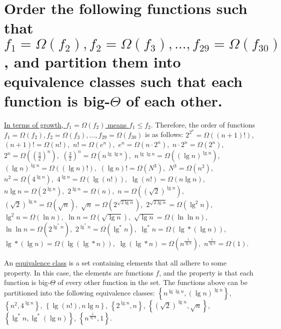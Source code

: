 \section[Problem 6]{Order the following functions such that $f_1 = \Omega(f_2), f_2 = \Omega(f_3), ..., f_{29} = \Omega(f_{30})$, and partition them into equivalence classes such that each function is big-$\Theta$ of each other.}

\ul{In terms of growth, $f_1 = \Omega(f_2)$ means $f_1 \leq f_2$}. Therefore, the order of functions $f_1 = \Omega(f_2), f_2 = \Omega(f_3), ..., f_{29} = \Omega(f_{30})$ is as follows:
$2^{2^n} = \Omega \left((n + 1)! \right), $
$(n + 1)! = \Omega \left(n! \right), $
$n! = \Omega \left(e^n \right), $
$e^n = \Omega \left(n \cdot 2^n \right), $
$n \cdot 2^n = \Omega \left(2^n \right), $
$2^n = \Omega \left(\left( \frac{3}{2} \right)^n \right), $
$\left( \frac{3}{2} \right)^n = \Omega \left(n^{\lg \lg n} \right), $
$n^{\lg \lg n} = \Omega \left(\left( \lg n \right)^{\lg n} \right), $
$\left( \lg n \right)^{\lg n} = \Omega \left((\lg n)! \right), $
$(\lg n)! = \Omega \left(N^3 \right), $
$N^3 = \Omega \left(n^2 \right), $
$n^2 = \Omega \left(4^{\lg n} \right), $
$4^{\lg n} = \Omega \left(\lg (n!) \right), $
$\lg (n!)  = \Omega \left(n \lg n \right), $
$n \lg n = \Omega \left(2^{\lg n} \right), $
$2^{\lg n} = \Omega \left(n \right), $
$n = \Omega \left(\left( \sqrt{2} \right)^{\lg n} \right), $
$\left( \sqrt{2} \right)^{\lg n} = \Omega \left(\sqrt{n} \right), $
$\sqrt{n} = \Omega \left(2^{\sqrt{2 \lg n}} \right), $
$2^{\sqrt{2 \lg n}} = \Omega \left(\lg ^2 n \right), $
$\lg ^2 n = \Omega \left(\ln n \right), $
$\ln n = \Omega \left(\sqrt{\lg n} \right), $
$\sqrt{\lg n} = \Omega \left(\ln \ln n \right), $
$\ln \ln n = \Omega \left(2^{\lg ^* n} \right), $
$2^{\lg ^* n} = \Omega \left(\lg ^* n \right), $
$\lg ^* n = \Omega \left(\lg * (\lg n) \right), $
$\lg * (\lg n) = \Omega \left(\lg (\lg * n) \right), $
$\lg (\lg * n) = \Omega \left(n^{\frac{1}{\lg n}} \right), $
$n^{\frac{1}{\lg n}} = \Omega (1)$. 

An \ul{equivalence class} is a set containing elements that all adhere to some property. In this case, the elements are functions $f$, and the property is that each function is big-$\Theta$ of every other function in the set. The functions above can be partitioned into the following equivalence classes:
$\left\{ n^{\lg \lg n}, \left( \lg n \right)^{\lg n} \right\}$, 
$\left\{ n^2, 4^{\lg n} \right\}$,
$\left\{ \lg(n!), n \lg n \right\}$,
$\left\{ 2^{\lg n}, n \right\}$,
$\left\{ \left( \sqrt{2} \right) ^{\lg n}, \sqrt{n} \right\}$, \\ %
$\left\{ \lg^* n, \lg^* (\lg n) \right\}$,
$\left\{ n^{\frac{1}{\lg n}}, 1 \right\}$.


